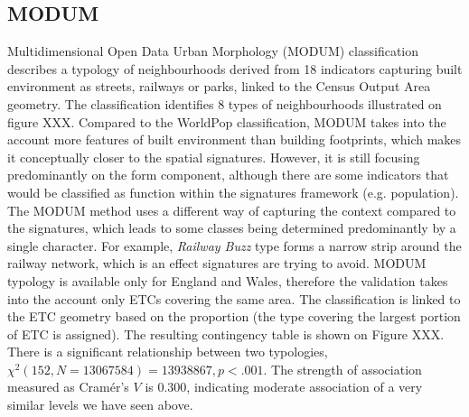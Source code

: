 \subsection*{MODUM}
Multidimensional Open Data Urban Morphology (MODUM) classification describes a typology
of neighbourhoods derived from 18 indicators capturing built environment as streets,
railways or parks, linked to the Census Output Area geometry. The classification
identifies 8 types of neighbourhoods illustrated on figure XXX.
Compared to the WorldPop classification, MODUM takes into the account more features of
built environment than building footprints, which makes it conceptually closer to the
spatial signatures. However, it is still focusing predominantly on the form component,
although there are some indicators that would be classified as function within the
signatures framework (e.g. population). The MODUM method uses a different way of
capturing the context compared to the signatures, which leads to some classes being
determined predominantly by a single character. For example, \textit{Railway Buzz} type
forms a narrow strip around the railway network, which is an effect signatures are
trying to avoid.
MODUM typology is available only for England and Wales, therefore the validation takes
into the account only ETCs covering the same area. The classification is linked to the
ETC geometry based on the proportion (the type covering the largest portion of ETC is
assigned). The resulting contingency table is shown on Figure XXX. There is a
significant relationship between two typologies, $\chi^{2} (152, N = 13067584) =
13938867, p < .001$. The strength of association measured as Cramér's $V$ is $0.300$,
indicating moderate association of a very similar levels we have seen above.



